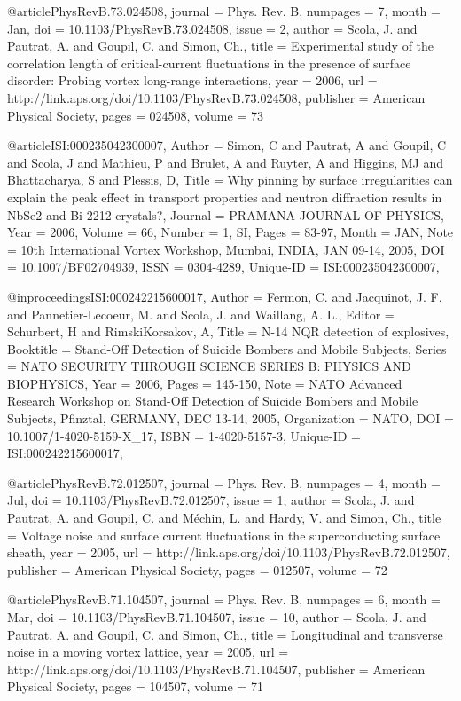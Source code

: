 {@article{PhysRevB.73.024508,
  journal = {Phys. Rev. B},
  numpages = {7},
  month = {Jan},
  doi = {10.1103/PhysRevB.73.024508},
  issue = {2},
  author = {Scola, J. and Pautrat, A. and Goupil, C. and Simon, Ch.},
  title = {Experimental study of the correlation length of critical-current fluctuations in the presence of surface disorder: Probing vortex long-range interactions},
  year = {2006},
  url = {http://link.aps.org/doi/10.1103/PhysRevB.73.024508},
  publisher = {American Physical Society},
  pages = {024508},
  volume = {73}
}

@article{ISI:000235042300007,
Author = {Simon, C and Pautrat, A and Goupil, C and Scola, J and Mathieu, P and
   Brulet, A and Ruyter, A and Higgins, MJ and Bhattacharya, S and Plessis,
   D},
Title = {{Why pinning by surface irregularities can explain the peak effect in
   transport properties and neutron diffraction results in NbSe2 and
   Bi-2212 crystals?}},
Journal = {{PRAMANA-JOURNAL OF PHYSICS}},
Year = {{2006}},
Volume = {{66}},
Number = {{1, SI}},
Pages = {{83-97}},
Month = {{JAN}},
Note = {{10th International Vortex Workshop, Mumbai, INDIA, JAN 09-14, 2005}},
DOI = {{10.1007/BF02704939}},
ISSN = {{0304-4289}},
Unique-ID = {{ISI:000235042300007}},
}

@inproceedings{ISI:000242215600017,
Author = {Fermon, C. and Jacquinot, J. F. and Pannetier-Lecoeur, M. and Scola, J.
   and Waillang, A. L.},
Editor = {{Schurbert, H and RimskiKorsakov, A}},
Title = {{N-14 NQR detection of explosives}},
Booktitle = {{Stand-Off Detection of Suicide Bombers and Mobile Subjects}},
Series = {{NATO SECURITY THROUGH SCIENCE SERIES B: PHYSICS AND BIOPHYSICS}},
Year = {{2006}},
Pages = {{145-150}},
Note = {{NATO Advanced Research Workshop on Stand-Off Detection of Suicide
   Bombers and Mobile Subjects, Pfinztal, GERMANY, DEC 13-14, 2005}},
Organization = {{NATO}},
DOI = {{10.1007/1-4020-5159-X\_17}},
ISBN = {{1-4020-5157-3}},
Unique-ID = {{ISI:000242215600017}},
}


@article{PhysRevB.72.012507,
  journal = {Phys. Rev. B},
  numpages = {4},
  month = {Jul},
  doi = {10.1103/PhysRevB.72.012507},
  issue = {1},
  author = {Scola, J. and Pautrat, A. and Goupil, C. and M\'echin, L. and Hardy, V. and Simon, Ch.},
  title = {Voltage noise and surface current fluctuations in the superconducting surface sheath},
  year = {2005},
  url = {http://link.aps.org/doi/10.1103/PhysRevB.72.012507},
  publisher = {American Physical Society},
  pages = {012507},
  volume = {72}
}

@article{PhysRevB.71.104507,
  journal = {Phys. Rev. B},
  numpages = {6},
  month = {Mar},
  doi = {10.1103/PhysRevB.71.104507},
  issue = {10},
  author = {Scola, J. and Pautrat, A. and Goupil, C. and Simon, Ch.},
  title = {Longitudinal and transverse noise in a moving vortex lattice},
  year = {2005},
  url = {http://link.aps.org/doi/10.1103/PhysRevB.71.104507},
  publisher = {American Physical Society},
  pages = {104507},
  volume = {71}
}


}
